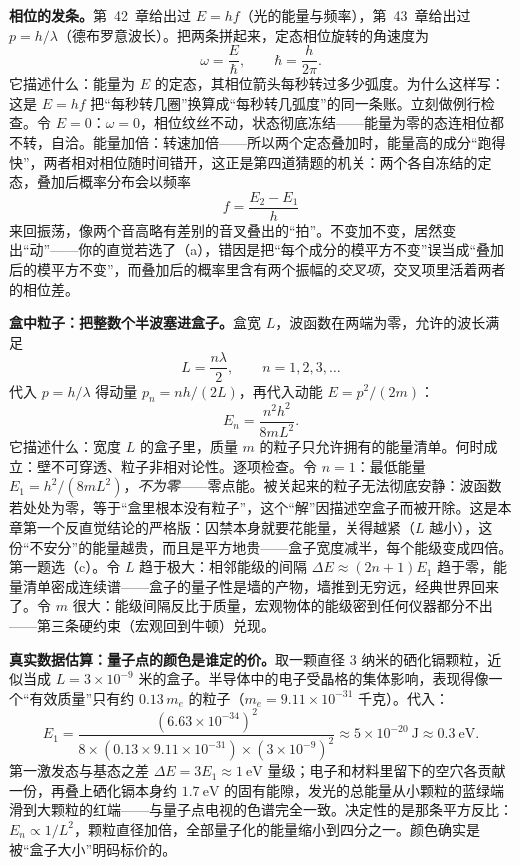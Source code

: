 \begin{mainline}
\textbf{相位的发条。}第~42~章给出过 \(E=hf\)（光的能量与频率），第~43~章给出过 \(p=h/\lambda\)（德布罗意波长）。把两条拼起来，定态相位旋转的角速度为
\[
  \omega=\frac{E}{\hbar},\qquad \hbar=\frac{h}{2\pi}.
\]
它描述什么：能量为 \(E\) 的定态，其相位箭头每秒转过多少弧度。为什么这样写：这是 \(E=hf\) 把“每秒转几圈”换算成“每秒转几弧度”的同一条账。立刻做例行检查。令 \(E=0\)：\(\omega=0\)，相位纹丝不动，状态彻底冻结——能量为零的态连相位都不转，自洽。能量加倍：转速加倍——所以两个定态叠加时，能量高的成分“跑得快”，两者相对相位随时间错开，这正是第四道猜题的机关：两个各自冻结的定态，叠加后概率分布会以频率
\[
  f=\frac{E_{2}-E_{1}}{h}
\]
来回振荡，像两个音高略有差别的音叉叠出的“拍”。不变加不变，居然变出“动”——你的直觉若选了（a），错因是把“每个成分的模平方不变”误当成“叠加后的模平方不变”，而叠加后的概率里含有两个振幅的\emph{交叉项}，交叉项里活着两者的相位差。

\textbf{盒中粒子：把整数个半波塞进盒子。}盒宽 \(L\)，波函数在两端为零，允许的波长满足
\[
  L=\frac{n\lambda}{2},\qquad n=1,2,3,\dots
\]
代入 \(p=h/\lambda\) 得动量 \(p_{n}=nh/(2L)\)，再代入动能 \(E=p^{2}/(2m)\)：
\[
  E_{n}=\frac{n^{2}h^{2}}{8mL^{2}}.
\]
它描述什么：宽度 \(L\) 的盒子里，质量 \(m\) 的粒子只允许拥有的能量清单。何时成立：壁不可穿透、粒子非相对论性。逐项检查。令 \(n=1\)：最低能量 \(E_{1}=h^{2}/(8mL^{2})\)，\emph{不为零}——零点能。被关起来的粒子无法彻底安静：波函数若处处为零，等于“盒里根本没有粒子”，这个“解”因描述空盒子而被开除。这是本章第一个反直觉结论的严格版：囚禁本身就要花能量，关得越紧（\(L\) 越小），这份“不安分”的能量越贵，而且是平方地贵——盒子宽度减半，每个能级变成四倍。第一题选（c）。令 \(L\) 趋于极大：相邻能级的间隔 \(\Delta E\approx(2n+1)E_{1}\) 趋于零，能量清单密成连续谱——盒子的量子性是墙的产物，墙推到无穷远，经典世界回来了。令 \(m\) 很大：能级间隔反比于质量，宏观物体的能级密到任何仪器都分不出——第三条硬约束（宏观回到牛顿）兑现。

\textbf{真实数据估算：量子点的颜色是谁定的价。}取一颗直径 \(3\) 纳米的硒化镉颗粒，近似当成 \(L=3\times10^{-9}\) 米的盒子。半导体中的电子受晶格的集体影响，表现得像一个“有效质量”只有约 \(0.13\,m_{e}\) 的粒子（\(m_{e}=9.11\times10^{-31}\) 千克）。代入：
\[
  E_{1}=\frac{(6.63\times10^{-34})^{2}}{8\times(0.13\times9.11\times10^{-31})\times(3\times10^{-9})^{2}}
  \approx5\times10^{-20}\ \text{J}\approx0.3\ \text{eV}.
\]
第一激发态与基态之差 \(\Delta E=3E_{1}\approx1\ \text{eV}\) 量级；电子和材料里留下的空穴各贡献一份，再叠上硒化镉本身约 \(1.7\ \text{eV}\) 的固有能隙，发光的总能量从小颗粒的蓝绿端滑到大颗粒的红端——与量子点电视的色谱完全一致。决定性的是那条平方反比：\(E_{n}\propto1/L^{2}\)，颗粒直径加倍，全部量子化的能量缩小到四分之一。颜色确实是被“盒子大小”明码标价的。


\end{mainline}
